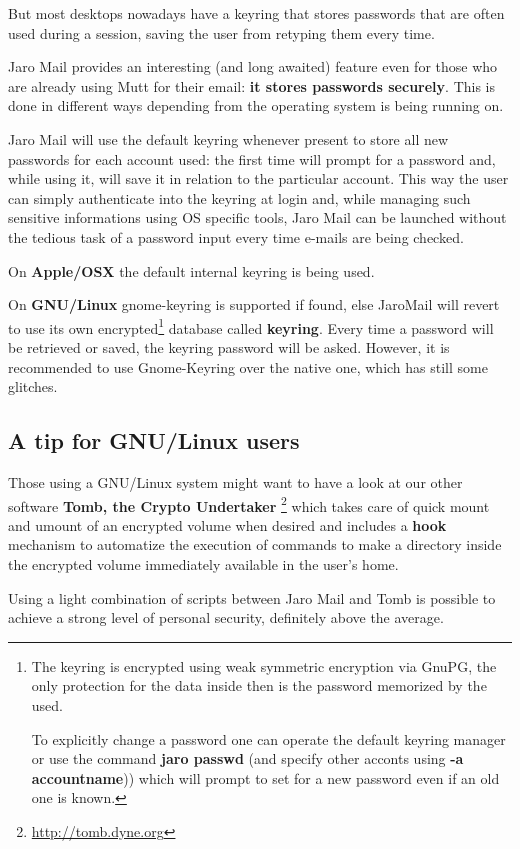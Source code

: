 \documentclass[a4,onecolumn,portrait]{article}
\begin{document}
But most desktops nowadays have a keyring that stores passwords that are often used during a session, saving the user from retyping them every time.

Jaro Mail provides an interesting (and long awaited) feature even for those who are already using Mutt for their email: \textbf{it stores passwords securely}. This is done in different ways depending from the operating system is being running on.

Jaro Mail will use the default keyring whenever present to store all new passwords for each account used: the first time will prompt for a password and, while using it, will save it in relation to the particular account. This way the user can simply authenticate into the keyring at login and, while managing such sensitive informations using OS specific tools, Jaro Mail can be launched without the tedious task of a password input every time e-mails are being checked.

On \textbf{Apple/OSX} the default internal keyring is being used.

On \textbf{GNU/Linux} gnome-keyring is supported if found, else JaroMail will revert to use its own encrypted\footnote{The keyring is encrypted using weak symmetric encryption via GnuPG, the only protection for the data inside then is the password memorized by the used.

To explicitly change a password one can operate the default keyring manager or use the command \textbf{jaro passwd} (and specify other acconts using \textbf{-a accountname})) which will prompt to set for a new password even if an old one is known.} database called \textbf{keyring}. Every time a password will be retrieved or saved, the keyring password will be asked. However, it is recommended to use Gnome-Keyring over the native one, which has still some glitches.
\subsection{A tip for GNU/Linux users}
\label{sec-10-2}

Those using a GNU/Linux system might want to have a look at our other software \textbf{Tomb, the Crypto Undertaker} \footnote{\url{http://tomb.dyne.org}} which takes care of quick mount and umount of an encrypted volume when desired and includes a \textbf{hook} mechanism to automatize the execution of commands to make a directory inside the encrypted volume immediately available in the user's home.

Using a light combination of scripts between Jaro Mail and Tomb is possible to achieve a strong level of personal security, definitely above the average.
\end{document}

